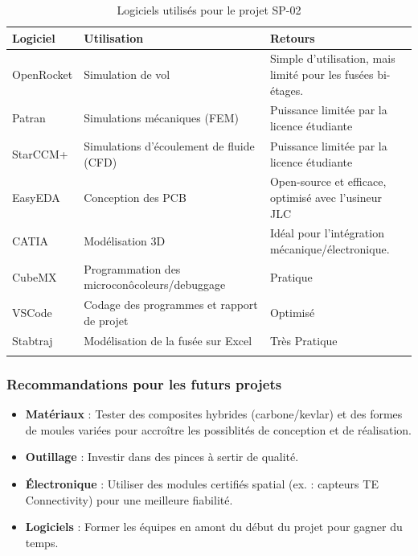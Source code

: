 \begin{longtable}{|p{2cm}|p{5cm}|p{6cm}|}
    \hline
    \textbf{Logiciel} & \textbf{Utilisation} & \textbf{Retours} \\
    \hline
    OpenRocket & Simulation de vol & Simple d’utilisation, mais limité pour les fusées bi-étages. \\
    \hline
    Patran & Simulations mécaniques (FEM) & Puissance limitée par la licence étudiante \\
    \hline
    StarCCM+ & Simulations d'écoulement de fluide (CFD) & Puissance limitée par la licence étudiante \\
    \hline
    EasyEDA & Conception des PCB & Open-source et efficace, optimisé avec l'usineur JLC \\
    \hline
    CATIA & Modélisation 3D & Idéal pour l’intégration mécanique/électronique. \\
    \hline
    CubeMX & Programmation des microconôcoleurs/debuggage & Pratique \\
    \hline
    VSCode & Codage des programmes et rapport de projet & Optimisé \\
    \hline
    Stabtraj & Modélisation de la fusée sur Excel & Très Pratique \\
    \hline
    \caption{Logiciels utilisés pour le projet SP-02}
    \label{tab:logiciels}
\end{longtable}

\subsubsection*{Recommandations pour les futurs projets}
\begin{itemize}
    \item \textbf{Matériaux} : Tester des composites hybrides (carbone/kevlar) et des formes de moules variées pour accroître les possiblités de conception et de réalisation.
    \item \textbf{Outillage} : Investir dans des pinces à sertir de qualité.
    \item \textbf{Électronique} : Utiliser des modules certifiés spatial (ex. : capteurs TE Connectivity) pour une meilleure fiabilité.
    \item \textbf{Logiciels} : Former les équipes en amont du début du projet pour gagner du temps.
\end{itemize}
